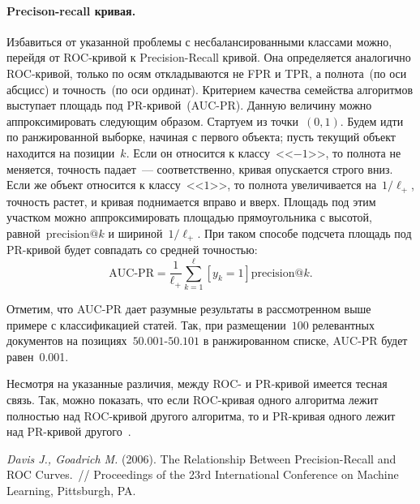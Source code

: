 \documentclass[12pt,fleqn]{article}
\begin{document}
\paragraph{Precison-recall кривая.}
Избавиться от указанной проблемы с несбалансированными классами можно,
перейдя от ROC-кривой к Precision-Recall кривой.
Она определяется аналогично ROC-кривой, только по осям
откладываются не FPR и TPR, а полнота~(по оси абсцисс) и точность~(по оси ординат).
Критерием качества семейства алгоритмов выступает площадь под PR-кривой~(AUC-PR).
Данную величину можно аппроксимировать следующим образом.
Стартуем из точки~$(0, 1)$.
Будем идти по ранжированной выборке, начиная с первого объекта;
пусть текущий объект находится на позиции~$k$.
Если он относится к классу~<<$-1$>>,
то полнота не меняется, точность падает~--- соответственно, кривая опускается строго вниз.
Если же объект относится к классу~<<$1$>>,
то полнота увеличивается на~$1/\ell_{+}$, точность растет, и кривая поднимается вправо и вверх.
Площадь под этим участком можно аппроксимировать площадью прямоугольника
с высотой, равной~$\text{precision}@k$ и шириной~$1/\ell_{+}$.
При таком способе подсчета площадь под PR-кривой будет совпадать со средней точностью:
\[
    \text{AUC-PR}
    =
    \frac{1}{\ell_{+}}
    \sum_{k = 1}^{\ell}
        [y_k = 1]
        \text{precision}@k.
\]

Отметим, что AUC-PR дает разумные результаты в рассмотренном выше примере с классификацией статей.
Так, при размещении~$100$ релевантных документов на позициях~$50.001$-$50.101$ в ранжированном списке,
AUC-PR будет равен~0.001.

Несмотря на указанные различия, между ROC- и PR-кривой имеется тесная связь.
Так, можно показать, что если ROC-кривая одного алгоритма лежит полностью над
ROC-кривой другого алгоритма, то и PR-кривая одного лежит над PR-кривой другого~\cite{davis06pr}.

\begin{thebibliography}{1}
    \emph{Davis J., Goadrich M.} (2006).
    The Relationship Between Precision-Recall and ROC Curves.~//
    Proceedings of the 23rd International Conference on Machine Learning, Pittsburgh, PA.
\end{thebibliography}
\end{document}
